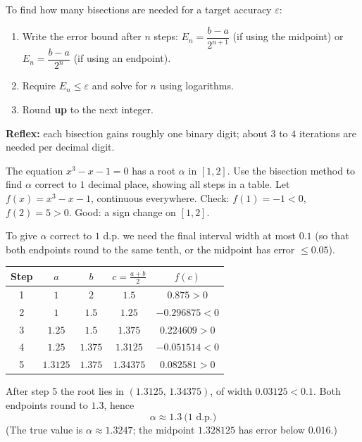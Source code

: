 \documentclass[11pt]{article}
\begin{document}
\begin{methode}
To find how many bisections are needed for a target accuracy $\varepsilon$:
\begin{enumerate}
\item Write the error bound after $n$ steps: $E_n = \dfrac{b-a}{2^{n+1}}$ (if using the midpoint) or $E_n = \dfrac{b-a}{2^{n}}$ (if using an endpoint).
\item Require $E_n \le \varepsilon$ and solve for $n$ using logarithms.
\item Round \textbf{up} to the next integer.
\end{enumerate}
\textbf{Reflex:} each bisection gains roughly one binary digit; about $3$ to $4$ iterations are needed per decimal digit.
\end{methode}

\begin{exoresolu}
The equation $x^{3}-x-1=0$ has a root $\alpha$ in $[1,2]$. Use the bisection method to find $\alpha$ correct to $1$ decimal place, showing all steps in a table.
\tcblower
Let $f(x)=x^{3}-x-1$, continuous everywhere. Check: $f(1)=-1<0$, $f(2)=5>0$. Good: a sign change on $[1,2]$.

To give $\alpha$ correct to $1$ d.p. we need the final interval width at most $0.1$ (so that both endpoints round to the same tenth, or the midpoint has error $\le 0.05$).

\begin{center}
\begin{tabular}{|c|c|c|c|c|}
\hline
\rowcolor{popblueL} Step & $a$ & $b$ & $c=\frac{a+b}{2}$ & $f(c)$ \\
\hline
1 & $1$ & $2$ & $1.5$ & $0.875>0$ \\
\hline
2 & $1$ & $1.5$ & $1.25$ & $-0.296875<0$ \\
\hline
3 & $1.25$ & $1.5$ & $1.375$ & $0.224609>0$ \\
\hline
4 & $1.25$ & $1.375$ & $1.3125$ & $-0.051514<0$ \\
\hline
5 & $1.3125$ & $1.375$ & $1.34375$ & $0.082581>0$ \\
\hline
\end{tabular}
\end{center}

After step 5 the root lies in $(1.3125,\,1.34375)$, of width $0.03125<0.1$. Both endpoints round to $1.3$, hence
\[ \boxed{\alpha\approx 1.3\ \text{(1 d.p.)}} \]
(The true value is $\alpha\approx1.3247$; the midpoint $1.328125$ has error below $0.016$.)
\end{exoresolu}
\end{document}
